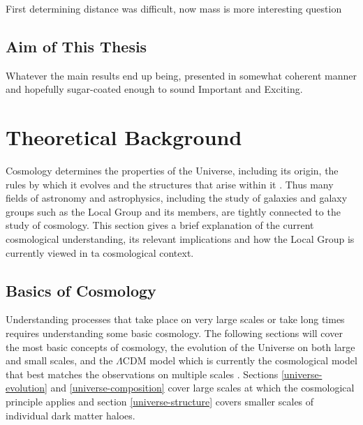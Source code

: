 \documentclass[english, oneside]{HYgradu}
\begin{document}
First determining distance was difficult, now mass is more interesting question

\section{Aim of This Thesis}
Whatever the main results end up being, presented in somewhat coherent manner and hopefully sugar-coated enough to sound Important and Exciting.


\chapter{Theoretical Background}

Cosmology determines the properties of the Universe, including its origin, the rules by which it evolves and the structures that arise within it \citep{mo2010galaxy}. Thus many fields of astronomy and astrophysics, including the study of galaxies and galaxy groups such as the Local Group and its members, are tightly connected to the study of cosmology. This section gives a brief explanation of the current cosmological understanding, its relevant implications and how the Local Group is currently viewed in ta cosmological context.

\section{Basics of Cosmology}
Understanding processes that take place on very large scales or take long times requires understanding some basic cosmology. The following sections will cover the most basic concepts of cosmology, the evolution of the Universe on both large and small scales, and the $\Lambda$CDM model which is currently the cosmological model that best matches the observations on multiple scales \citep{mo2010galaxy}. Sections \ref{universe-evolution} and \ref{universe-composition} cover large scales at which the cosmological principle applies and section \ref{universe-structure} covers smaller scales of individual dark matter haloes.
\end{document}
